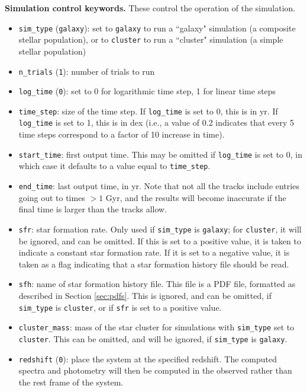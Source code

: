 \documentclass[12pt]{article}
\begin{document}
\noindent
\textbf{Simulation control keywords.} These control the operation of the simulation.
\begin{itemize}
\item \verb=sim_type= (\verb=galaxy=): set to \verb=galaxy= to run a ``galaxy" simulation (a composite stellar population), or to \verb=cluster= to run a ``cluster" simulation (a simple stellar population)
\item \verb=n_trials= (\verb=1=): number of trials to run
\item \verb=log_time= (\verb=0=): set to 0 for logarithmic time step, 1 for linear time steps
\item \verb=time_step=: size of the time step. If \verb=log_time= is set to 0, this is in yr. If \verb=log_time= is set to 1, this is in dex (i.e., a value of 0.2 indicates that every 5 time steps correspond to a factor of 10 increase in time).
\item \verb=start_time=: first output time. This may be omitted if \verb=log_time= is set to 0, in which case it defaults to a value equal to \verb=time_step=.
\item \verb=end_time=: last output time, in yr. Note that not all the tracks include entries going out to times $>1$ Gyr, and the results will become inaccurate if the final time is larger than the tracks allow.
\item \verb=sfr=: star formation rate. Only used if \verb=sim_type= is \verb=galaxy=; for \verb=cluster=, it will be ignored, and can be omitted. If this is set to a positive value, it is taken to indicate a constant star formation rate. If it is set to a negative value, it is taken as a flag indicating that a star formation history file should be read.
\item \verb=sfh=: name of star formation history file. This file is a PDF file, formatted as described in Section \ref{sec:pdfs}. This is ignored, and can be omitted, if \verb=sim_type= is \verb=cluster=, or if \verb=sfr= is set to a positive value.
\item \verb=cluster_mass=: mass of the star cluster for simulations with \verb=sim_type= set to \verb=cluster=. This can be omitted, and will be ignored, if \verb=sim_type= is \verb=galaxy=.
\item \verb=redshift= (\verb=0=): place the system at the specified redshift. The computed spectra and photometry will then be computed in the observed rather than the rest frame of the system.
\end{itemize}
\end{document}
